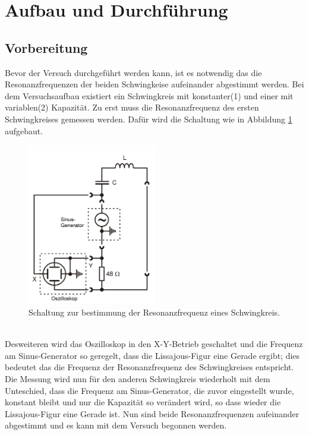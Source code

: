 \section{Aufbau und Durchführung}
\label{sec:Durchführung}
 \subsection{Vorbereitung}
  \label{subsec:Vorbereitung}
Bevor der Versuch durchgeführt werden kann,
ist es notwendig das die Resonanzfrequenzen der
beiden Schwingkeise aufeinander abgestimmt werden.
Bei dem Versuchsaufbau existiert ein Schwingkreis
mit konstanter(1) und einer mit variablen(2) Kapazität.
Zu erst muss die Resonanzfrequenz des ersten
Schwingkreises gemessen werden. Dafür wird die Schaltung
wie in Abbildung \ref{abb:messungresonanz} aufgebaut.
\begin{figure}[h]
     \centering
     \includegraphics[width=0.5\textwidth]{resonanzbestimmung.PNG}
     \caption{Schaltung zur bestimmung der
     Resonanzfrequenz eines Schwingkreis.\cite{skript} }
     \label{abb:messungresonanz}
\end{figure}\\
Desweiteren wird das Oszilloskop in den X-Y-Betrieb geschaltet und
die Frequenz am Sinus-Generator so geregelt, dass die Lissajous-Figur
eine Gerade ergibt; dies bedeutet das die Frequenz der Resonanzfrequenz des
Schwingkreises entspricht. Die Messung wird nun für den anderen Schwingkreis wiederholt
mit dem Unteschied, dass die Frequenz am Sinus-Generator, die zuvor eingestellt wurde,
konstant bleibt und nur die Kapazität so verändert wird, so dass wieder die Lissajous-Figur
eine Gerade ist. Nun sind beide Resonanzfrequenzen aufeinander abgestimmt und es kann mit
dem Versuch begonnen werden.
\newpage
